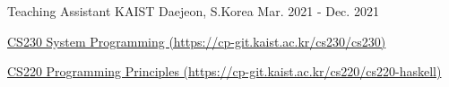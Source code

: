 

\begin{cventries}

  \cventry
    {Teaching Assistant} %
    {KAIST} %
    {Daejeon, S.Korea} %
    {Mar. 2021 - Dec. 2021} %
    {
      \begin{cvitems} %
        \item \href{https://cp-git.kaist.ac.kr/cs230/cs230}{CS230 System Programming (https://cp-git.kaist.ac.kr/cs230/cs230)}
        \item \href{https://cp-git.kaist.ac.kr/cs220/cs220-haskell}{CS220 Programming Principles (https://cp-git.kaist.ac.kr/cs220/cs220-haskell)}
      \end{cvitems}
    }


\end{cventries}
